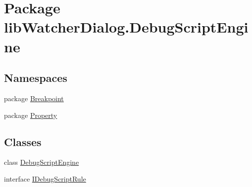 \hypertarget{namespacelib_watcher_dialog_1_1_debug_script_engine}{\section{Package lib\+Watcher\+Dialog.\+Debug\+Script\+Engine}
\label{namespacelib_watcher_dialog_1_1_debug_script_engine}
}
\subsection*{Namespaces}
\begin{DoxyCompactItemize}
\item 
package \hyperlink{namespacelib_watcher_dialog_1_1_debug_script_engine_1_1_breakpoint}{Breakpoint}
\item 
package \hyperlink{namespacelib_watcher_dialog_1_1_debug_script_engine_1_1_property}{Property}
\end{DoxyCompactItemize}
\subsection*{Classes}
\begin{DoxyCompactItemize}
\item 
class \hyperlink{classlib_watcher_dialog_1_1_debug_script_engine_1_1_debug_script_engine}{Debug\+Script\+Engine}
\item 
interface \hyperlink{interfacelib_watcher_dialog_1_1_debug_script_engine_1_1_i_debug_script_rule}{I\+Debug\+Script\+Rule}
\end{DoxyCompactItemize}
